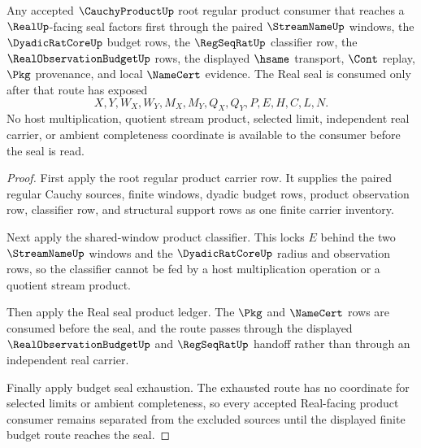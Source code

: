 \begin{theorem}
\label{thm:cauchyproduct-root-regular-product-budget-separation}
Any accepted $\CauchyProductUp$ root regular product consumer that reaches a $\RealUp$-facing seal factors first through the paired $\StreamNameUp$ windows, the $\DyadicRatCoreUp$ budget rows, the $\RegSeqRatUp$ classifier row, the $\RealObservationBudgetUp$ rows, the displayed $\hsame$ transport, $\Cont$ replay, $\Pkg$ provenance, and local $\NameCert$ evidence. The Real seal is consumed only after that route has exposed
$$
X,Y,W_X,W_Y,M_X,M_Y,Q_X,Q_Y,P,E,H,C,L,N.
$$
No host multiplication, quotient stream product, selected limit, independent real carrier, or ambient completeness coordinate is available to the consumer before the seal is read.
\end{theorem}
\begin{proof}
First apply the root regular product carrier row. It supplies the paired regular Cauchy sources, finite windows, dyadic budget rows, product observation row, classifier row, and structural support rows as one finite carrier inventory.

Next apply the shared-window product classifier. This locks $E$ behind the two $\StreamNameUp$ windows and the $\DyadicRatCoreUp$ radius and observation rows, so the classifier cannot be fed by a host multiplication operation or a quotient stream product.

Then apply the Real seal product ledger. The $\Pkg$ and $\NameCert$ rows are consumed before the seal, and the route passes through the displayed $\RealObservationBudgetUp$ and $\RegSeqRatUp$ handoff rather than through an independent real carrier.

Finally apply budget seal exhaustion. The exhausted route has no coordinate for selected limits or ambient completeness, so every accepted Real-facing product consumer remains separated from the excluded sources until the displayed finite budget route reaches the seal.
\end{proof}

